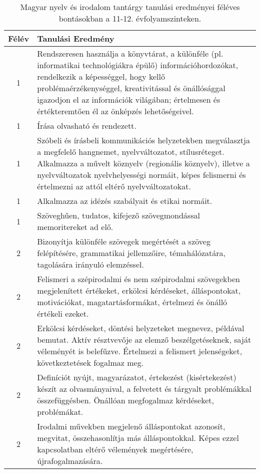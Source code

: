        
           \begin{longtable}{c | p{} }
            \caption[Magyar nyelv és irodalom 11-12.]{Magyar nyelv és irodalom tantárgy tanulási eredményei féléves bontásokban a 11-12. évfolyamszinteken. }  \\

            \textbf{Félév} & \textbf{Tanulási Eredmény} \\
            \hline
            \endhead
                                
                                          1 &  Rendszeresen használja a könyvtárat, a különféle (pl. informatikai technológiákra épülő) információhordozókat, rendelkezik a képességgel, hogy kellő problémaérzékenységgel, kreativitással és önállósággal igazodjon el az információk világában; értelmesen és értékteremtően él az önképzés lehetőségeivel. \\ \hline
                                          1 &  Írása olvasható és rendezett. \\ \hline
                                          1 &  Szóbeli és írásbeli kommunikációs helyzetekben megválasztja a megfelelő hangnemet, nyelvváltozatot, stílusréteget. Alkalmazza a művelt köznyelv (regionális köznyelv), illetve a nyelvváltozatok nyelvhelyességi normáit, képes felismerni és értelmezni az attól eltérő nyelvváltozatokat. \\ \hline
                                          1 &  Alkalmazza az idézés szabályait és etikai normáit. \\ \hline
                                          1 &  Szöveghűen, tudatos, kifejező szövegmondással memoritereket ad elő. \\ \hline
                                      
                                
                                          2 &  Bizonyítja különféle szövegek megértését a szöveg felépítésére, grammatikai jellemzőire, témahálózatára, tagolására irányuló elemzéssel. \\ \hline
                                          2 &  Felismeri a szépirodalmi és nem szépirodalmi szövegekben megjelenített értékeket, erkölcsi kérdéseket, álláspontokat, motivációkat, magatartásformákat, értelmezi és önálló értékeli ezeket. \\ \hline
                                          2 &  Erkölcsi kérdéseket, döntési helyzeteket megnevez, példával bemutat. Aktív résztvevője az elemző beszélgetéseknek, saját véleményét is belefűzve. Értelmezi a felismert jelenségeket, következtetések fogalmaz meg. \\ \hline
                                          2 &  Definíciót nyújt, magyarázatot, értekezést (kisértekezést) készít az olvasmányaival, a felvetett  és tárgyalt problémákkal összefüggésben. Önállóan megfogalmaz kérdéseket, problémákat. \\ \hline
                                          2 &  Irodalmi művekben megjelenő álláspontokat azonosít, megvitat, összehasonlítja más álláspontokkal. Képes ezzel kapcsolatban eltérő vélemények megértésére, újrafogalmazására. \\ \hline
                                      

\end{longtable}

